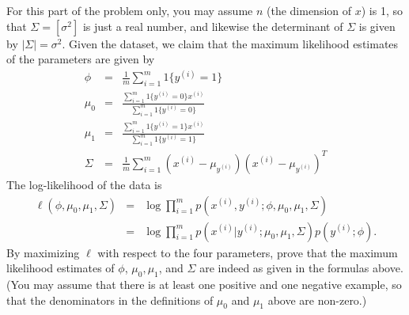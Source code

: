 \clearpage
\item {} For this part of the problem only, you may
  assume $n$ (the dimension of $x$) is 1, so that $\Sigma = [\sigma^2]$ is
  just a real number, and likewise the determinant of $\Sigma$ is given by
  $|\Sigma| = \sigma^2$.  Given the dataset, we claim that the maximum
  likelihood estimates of the parameters are given by
  \begin{eqnarray*}
    \phi &=& \frac{1}{m} \sum_{i=1}^m 1\{y^{(i)} = 1\} \\
\mu_{0} &=& \frac{\sum_{i=1}^m 1\{y^{(i)} = {0}\} x^{(i)}}{\sum_{i=1}^m
1\{y^{(i)} = {0}\}} \\
\mu_1 &=& \frac{\sum_{i=1}^m 1\{y^{(i)} = 1\} x^{(i)}}{\sum_{i=1}^m 1\{y^{(i)}
= 1\}} \\
\Sigma &=& \frac{1}{m} \sum_{i=1}^m (x^{(i)} - \mu_{y^{(i)}}) (x^{(i)} -
\mu_{y^{(i)}})^T
  \end{eqnarray*}
  The log-likelihood of the data is
  \begin{eqnarray*}
\ell(\phi, \mu_{0}, \mu_1, \Sigma) &=& \log \prod_{i=1}^m p(x^{(i)} , y^{(i)};
\phi, \mu_{0}, \mu_1, \Sigma) \\
&=& \log \prod_{i=1}^m p(x^{(i)} | y^{(i)}; \mu_{0}, \mu_1, \Sigma) p(y^{(i)};
\phi).
  \end{eqnarray*}
By maximizing $\ell$ with respect to the four parameters,
prove that the maximum likelihood estimates of $\phi$, $\mu_{0}, \mu_1$, and
$\Sigma$ are indeed as given in the formulas above.  (You may assume that there
is at least one positive and one negative example, so that the denominators in
the definitions of $\mu_{0}$ and $\mu_1$ above are non-zero.)

\ifnum{} {
  
} \fi
